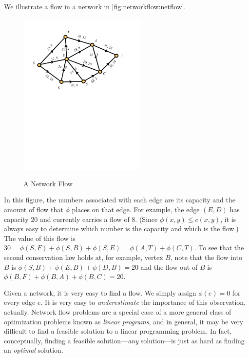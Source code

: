 We illustrate a flow in a network in
\autoref{fig:networkflow:netflow}. 
\begin{figure}[hb]
\begin{center}
\includegraphics*[viewport=37 410 531 734,width=2.5in]{networkflow-figs/webfig-31b}\\
\caption{A Network Flow}\label{fig:networkflow:netflow}
\end{center}
\end{figure}
In this figure, the numbers associated with each edge are its capacity
and the amount of flow that $\phi$ places on that edge. For example,
the edge $(E,D)$ has capacity $20$ and currently carries a flow of
$8$. (Since $\phi(x,y)\leq c(x,y)$, it is always easy to determine
which number is the capacity and which is the flow.) The value of this
flow is $30 = \phi(S,F)+\phi(S,B)+\phi(S,E)=\phi(A,T)+\phi(C,T)$. To
see that the second conservation law holds at, for example, vertex
$B$, note that the flow into $B$ is $\phi(S,B)+\phi(E,B)+\phi(D,B) =
20$ and the flow out of $B$ is $\phi(B,F)+\phi(B,A)+\phi(B,C)=20$.

\begin{remark}
  Given a network, it is very easy to find a flow.  We simply assign
  $\phi(e)=0$ for every edge $e$. It is very easy to
  \textit{underestimate} the importance of this observation,
  actually. Network flow problems are a special case of a more general
  class of optimization problems known as \emph{linear programs}, and
  in general, it may be very difficult to find a feasible solution to
  a linear programming problem.  In fact, conceptually, finding a
  feasible solution---\textit{any} solution---is just as hard as
  finding an \textit{optimal} solution.
\end{remark}

